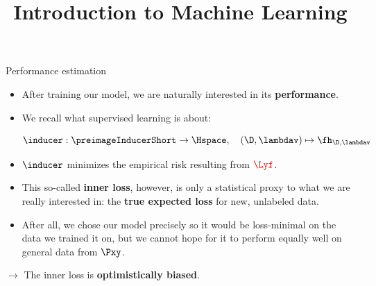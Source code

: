 \documentclass[11pt,compress,t,notes=noshow, xcolor=table]{beamer}
\title{Introduction to Machine Learning}
\institute{\href{https://compstat-lmu.github.io/lecture_i2ml/}{compstat-lmu.github.io/lecture\_i2ml}}
\date{}
\begin{document}








\begin{vbframe}{Performance estimation}

\begin{itemize}
  \item After training our model, we are naturally interested in its
  \textbf{performance}.
  \item We recall what supervised learning is about: 
  
  $$\inducer: \preimageInducerShort \rightarrow \Hspace, \quad (\D, \lambdav)
  \mapsto \fh_{\D, \lambdav}$$
  \item $\inducer$ minimizes the empirical risk resulting from 
  $\textcolor{red}{\Lyf}$.
  \item This so-called \textbf{inner loss}, however, is only a statistical proxy
  to what we are really interested in: the \textbf{true expected loss} for 
  new, unlabeled data.
  \item After all, we chose our model precisely so it would be loss-minimal 
  on the data we trained it on, but we cannot hope for it to perform equally 
  well on general data from $\Pxy$.
\end{itemize}

\lz
$\rightarrow$ The inner loss is \textbf{optimistically biased}.

\end{vbframe}

\end{document}
